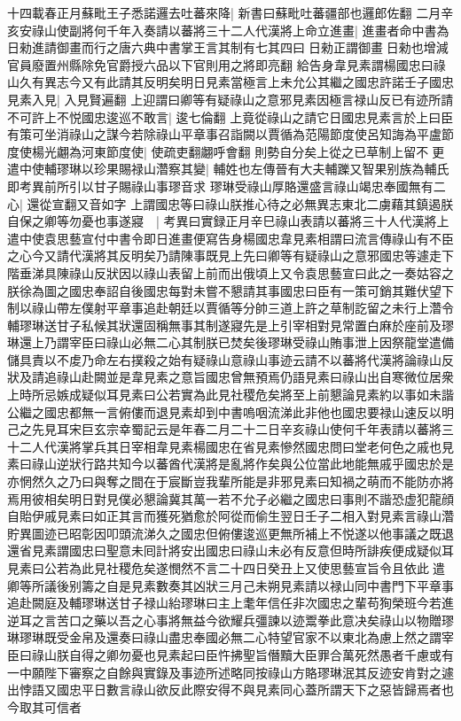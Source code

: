 十四載春正月蘇毗王子悉諾邏去吐蕃來降|{
	新書曰蘇毗吐蕃疆部也邏郎佐翻}
二月辛亥安祿山使副將何千年入奏請以蕃將三十二人代漢將上命立進畫|{
	進畫者命中書為日勑進請御畫而行之唐六典中書掌王言其制有七其四曰日勑正謂御畫日勑也增減官員廢置州縣除免官爵授六品以下官則用之將即亮翻}
給告身韋見素謂楊國忠曰祿山久有異志今又有此請其反明矣明日見素當極言上未允公其繼之國忠許諾壬子國忠見素入見|{
	入見賢遍翻}
上迎謂曰卿等有疑祿山之意邪見素因極言禄山反已有迹所請不可許上不悦國忠逡巡不敢言|{
	逡七倫翻}
上竟從祿山之請它日國忠見素言於上曰臣有策可坐消祿山之謀今若除祿山平章事召詣闕以賈循為范陽節度使呂知誨為平盧節度使楊光翽為河東節度使|{
	使疏吏翻翽呼會翻}
則勢自分矣上從之已草制上留不更遣中使輔璆琳以珍果賜禄山濳察其變|{
	輔姓也左傳晉有大夫輔躒又智果别族為輔氏即考異前所引以甘子賜祿山事璆音求}
璆琳受祿山厚賂還盛言祿山竭忠奉國無有二心|{
	還從宣翻又音如字}
上謂國忠等曰祿山朕推心待之必無異志東北二虜藉其鎮遏朕自保之卿等勿憂也事遂寢　|{
	考異曰實録正月辛巳祿山表請以蕃將三十人代漢將上遣中使袁思藝宣付中書令即日進畫便寫告身楊國忠韋見素相謂曰流言傳祿山有不臣之心今又請代漢將其反明矣乃請陳事既見上先曰卿等有疑祿山之意邪國忠等遽走下階垂涕具陳祿山反狀因以祿山表留上前而出俄頃上又令袁思藝宣曰此之一奏姑容之朕徐為圖之國忠奉詔自後國忠每對未嘗不懇請其事國忠曰臣有一策可銷其難伏望下制以祿山帶左僕射平章事追赴朝廷以賈循等分帥三道上許之草制訖留之未行上濳令輔璆琳送甘子私候其狀還固稱無事其制遂寢先是上引宰相對見常置白麻於座前及璆琳還上乃謂宰臣曰祿山必無二心其制朕已焚矣後璆琳受祿山賄事泄上因祭龍堂遣備儲具責以不䖍乃命左右撲殺之始有疑祿山意祿山事迹云請不以蕃將代漢將論祿山反狀及請追祿山赴闕並是韋見素之意旨國忠曾無預焉仍語見素曰祿山出自寒微位居衆上時所忌嫉成疑似耳見素曰公若實為此見社稷危矣將至上前懇論見素約以事如未諧公繼之國忠都無一言俯僂而退見素却到中書嗚咽流涕此非他也國忠要禄山速反以明己之先見耳宋巨玄宗幸蜀記云是年春二月二十二日辛亥祿山使何千年表請以蕃將三十二人代漢將掌兵其日宰相韋見素楊國忠在省見素慘然國忠問曰堂老何色之戚也見素曰祿山逆狀行路共知今以蕃酋代漢將是亂將作矣與公位當此地能無戚乎國忠於是亦惘然久之乃曰與奪之間在于宸斷豈我輩所能是非邪見素曰知禍之萌而不能防亦將焉用彼相矣明日對見僕必懇論冀其萬一若不允子必繼之國忠曰事則不諧恐虚犯龍顔自貽伊戚見素曰如正其言而獲死猶愈於阿從而偷生翌日壬子二相入對見素言祿山濳貯異圖迹已昭彰因叩頭流涕久之國忠但俯僂逡巡更無所補上不悦遂以他事議之既退還省見素謂國忠曰聖意未囘計將安出國忠曰祿山未必有反意但時所誹疾便成疑似耳見素曰公若為此見社稷危矣遂憫然不言二十四日癸丑上又使思藝宣旨令且依此遣卿等所議後别籌之自是見素數奏其凶狀三月己未朔見素請以禄山同中書門下平章事追赴闕庭及輔璆琳送甘子禄山紿璆琳曰主上耄年信任非次國忠之輩苟狥榮班今若進逆耳之言苦口之藥以吾之心事將無益今欲耀兵彊諫以迹鬻拳此意决矣祿山以物贈璆琳璆琳既受金帛及還奏曰祿山盡忠奉國必無二心特望官家不以東北為慮上然之謂宰臣曰祿山朕自得之卿勿憂也見素起曰臣忤拂聖旨僭黷大臣罪合萬死然愚者千慮或有一中願陛下審察之自餘與實錄及事迹所述略同按祿山方賂璆琳泯其反迹安肯對之遽出悖語又國忠平日數言祿山欲反此際安得不與見素同心蓋所謂天下之惡皆歸焉者也今取其可信者}
